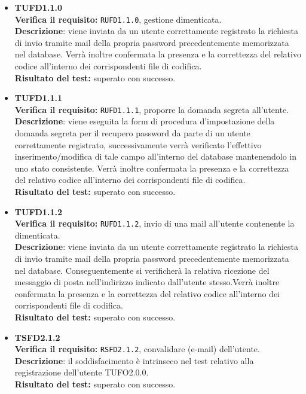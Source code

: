 \begin{itemize}
\item \textbf{TUFD1.1.0}\\
\textbf{Verifica il requisito:} \texttt{RUFD1.1.0}, gestione  dimenticata.\\
\textbf{Descrizione}: viene inviata da un utente  correttamente registrato la richiesta di invio tramite mail della propria password precedentemente memorizzata nel database. Verrà inoltre confermata la presenza e la correttezza del relativo codice all'interno dei corrispondenti file di codifica.\\
\textbf{Risultato del test:} superato con successo.

\item \textbf{TUFD1.1.1}\\
\textbf{Verifica il requisito:} \texttt{RUFD1.1.1}, proporre la domanda segreta all'utente.\\
\textbf{Descrizione}: viene eseguita la form di procedura d'impostazione della domanda segreta per il recupero password da parte di un utente  correttamente registrato, successivamente verrà verificato l'effettivo inserimento/modifica di tale campo all'interno del database mantenendolo in uno stato consistente. Verrà inoltre confermata la presenza e la correttezza del relativo codice all'interno dei corrispondenti file di codifica.\\
\textbf{Risultato del test:} superato con successo.

\item \textbf{TUFD1.1.2}\\
\textbf{Verifica il requisito:} \texttt{RUFD1.1.2}, invio di una mail all'utente contenente la  dimenticata.\\
\textbf{Descrizione}: viene inviata da un utente  correttamente registrato la richiesta di invio tramite mail della propria password precedentemente memorizzata nel database. Conseguentemente si verificherà la relativa ricezione del messaggio di posta nell'indirizzo indicato dall'utente stesso.Verrà inoltre confermata la presenza e la correttezza del relativo codice all'interno dei corrispondenti file di codifica.\\
\textbf{Risultato del test:} superato con successo.

\item \textbf{TSFD2.1.2}\\ 
\textbf{Verifica il requisito:} \texttt{RSFD2.1.2}, convalidare  (e-mail) dell'utente.\\
\textbf{Descrizione}: il soddisfacimento è intrinseco nel test relativo alla registrazione dell'utente TUFO2.0.0.\\
\textbf{Risultato del test:} superato con successo.


\end{itemize}
